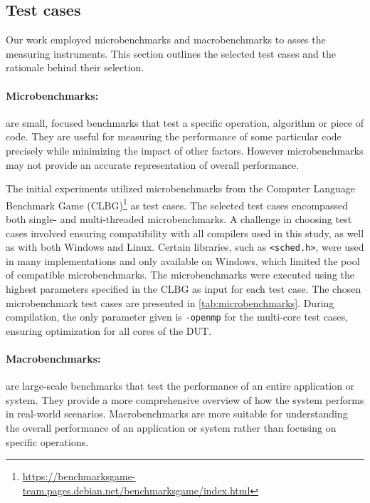 \subsection{Test cases}\label{subsec:test_cases}

Our work employed microbenchmarks and macrobenchmarks to asses the measuring instruments. This section outlines the selected test cases and the rationale behind their selection.

\paragraph{Microbenchmarks:} are small, focused benchmarks that test a specific operation, algorithm or piece of code. They are useful for measuring the performance of some particular code precisely while minimizing the impact of other factors. However microbenchmarks may not provide an accurate representation of overall performance.\cite{MicroVSMacro}

The initial experiments utilized microbenchmarks from the Computer Language Benchmark Game (CLBG)\footnote{\url{https://benchmarksgame-team.pages.debian.net/benchmarksgame/index.html}} as test cases. The selected test cases encompassed both single- and multi-threaded microbenchmarks. A challenge in choosing test cases involved ensuring compatibility with all compilers used in this study, as well as with both Windows and Linux. Certain libraries, such as \texttt{<sched.h>}, were used in many implementations and only available on Windows, which limited the pool of compatible microbenchmarks. The microbenchmarks were executed using the highest parameters specified in the CLBG as input for each test case. The chosen microbenchmark test cases are presented in \cref{tab:microbenchmarks}. During compilation, the only parameter given is \texttt{-openmp} for the multi-core test cases, ensuring optimization for all cores of the DUT.



\paragraph{Macrobenchmarks:} are large-scale benchmarks that test the performance of an entire application or system. They provide a more comprehensive overview of how the system performs in real-world scenarios. Macrobenchmarks are more suitable for understanding the overall performance of an application or system rather than focusing on specific operations.\cite{MicroVSMacro}
